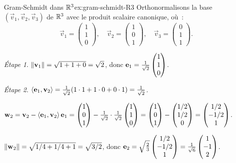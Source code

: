 \begin{example}{Gram-Schmidt dans ${\mathbb{R}}^3$}{ex:gram-schmidt-R3}
  Orthonormalisons la base $(\vec{v}_1,\vec{v}_2,\vec{v}_3)$ de ${\mathbb{R}}^3$
  avec le produit scalaire canonique, où~:
  \[
    \vec{v}_1=\begin{pmatrix}1\\1\\0\end{pmatrix},\quad
    \vec{v}_2=\begin{pmatrix}1\\0\\1\end{pmatrix},\quad
    \vec{v}_3=\begin{pmatrix}0\\1\\1\end{pmatrix}.
  \]

  \emph{Étape 1.}
  $\lVert\mathbf{v}_1\rVert=\sqrt{1+1+0}=\sqrt{2}$, donc
  $\mathbf{e}_{1}=\frac{1}{\sqrt{2}}\begin{pmatrix}1\\1\\0\end{pmatrix}$.

  \emph{Étape 2.}
  $\langle\mathbf{e}_{1},\mathbf{v}_2\rangle
  =\frac{1}{\sqrt{2}}(1\cdot 1+1\cdot 0+0\cdot 1)=\frac{1}{\sqrt{2}}$.

  $\mathbf{w}_2=\mathbf{v}_2-\langle\mathbf{e}_{1},\mathbf{v}_2\rangle\,\mathbf{e}_{1}
  =\begin{pmatrix}1\\0\\1\end{pmatrix}
  -\frac{1}{\sqrt{2}}\cdot\frac{1}{\sqrt{2}}
  \begin{pmatrix}1\\1\\0\end{pmatrix}
  =\begin{pmatrix}1\\0\\1\end{pmatrix}
  -\begin{pmatrix}1/2\\1/2\\0\end{pmatrix}
  =\begin{pmatrix}1/2\\-1/2\\1\end{pmatrix}$.

  $\lVert\mathbf{w}_2\rVert=\sqrt{1/4+1/4+1}=\sqrt{3/2}$, donc
  $\mathbf{e}_{2}=\sqrt{\frac{2}{3}}\begin{pmatrix}1/2\\-1/2\\1\end{pmatrix}
  =\frac{1}{\sqrt{6}}\begin{pmatrix}1\\-1\\2\end{pmatrix}$.


\end{example}
